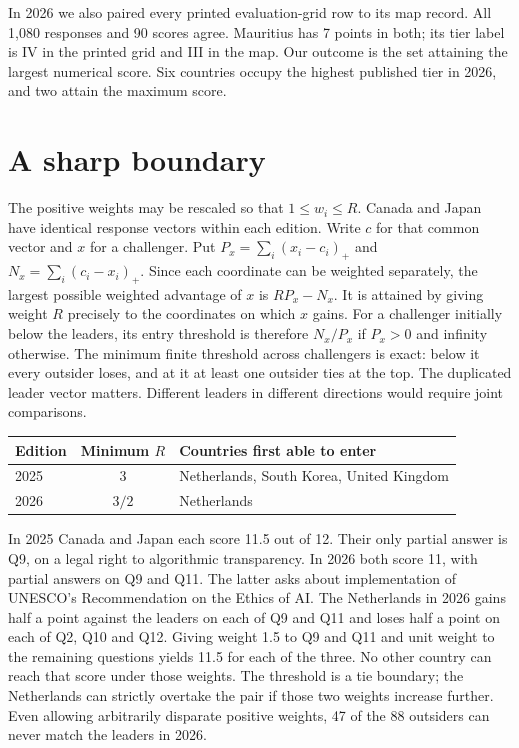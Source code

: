 \documentclass[11pt]{article}
\begin{document}
In 2026 we also paired every printed evaluation-grid row to its map record. All 1,080 responses and 90 scores agree. Mauritius has 7 points in both; its tier label is IV in the printed grid and III in the map. Our outcome is the set attaining the largest numerical score. Six countries occupy the highest published tier in 2026, and two attain the maximum score.

\section{A sharp boundary}
The positive weights may be rescaled so that $1\le w_i\le R$. Canada and Japan have identical response vectors within each edition. Write $c$ for that common vector and $x$ for a challenger. Put $P_x=\sum_i(x_i-c_i)_+$ and $N_x=\sum_i(c_i-x_i)_+$. Since each coordinate can be weighted separately, the largest possible weighted advantage of $x$ is $R P_x-N_x$. It is attained by giving weight $R$ precisely to the coordinates on which $x$ gains. For a challenger initially below the leaders, its entry threshold is therefore $N_x/P_x$ if $P_x>0$ and infinity otherwise. The minimum finite threshold across challengers is exact: below it every outsider loses, and at it at least one outsider ties at the top. The duplicated leader vector matters. Different leaders in different directions would require joint comparisons.

\begin{center}
\begin{tabular}{lcl}
\toprule
Edition & Minimum $R$ & Countries first able to enter\\
\midrule
2025 & $3$ & Netherlands, South Korea, United Kingdom\\
2026 & $3/2$ & Netherlands\\
\bottomrule
\end{tabular}
\end{center}

In 2025 Canada and Japan each score 11.5 out of 12. Their only partial answer is Q9, on a legal right to algorithmic transparency. In 2026 both score 11, with partial answers on Q9 and Q11. The latter asks about implementation of UNESCO's Recommendation on the Ethics of AI. The Netherlands in 2026 gains half a point against the leaders on each of Q9 and Q11 and loses half a point on each of Q2, Q10 and Q12. Giving weight 1.5 to Q9 and Q11 and unit weight to the remaining questions yields 11.5 for each of the three. No other country can reach that score under those weights. The threshold is a tie boundary; the Netherlands can strictly overtake the pair if those two weights increase further. Even allowing arbitrarily disparate positive weights, 47 of the 88 outsiders can never match the leaders in 2026.
\end{document}
